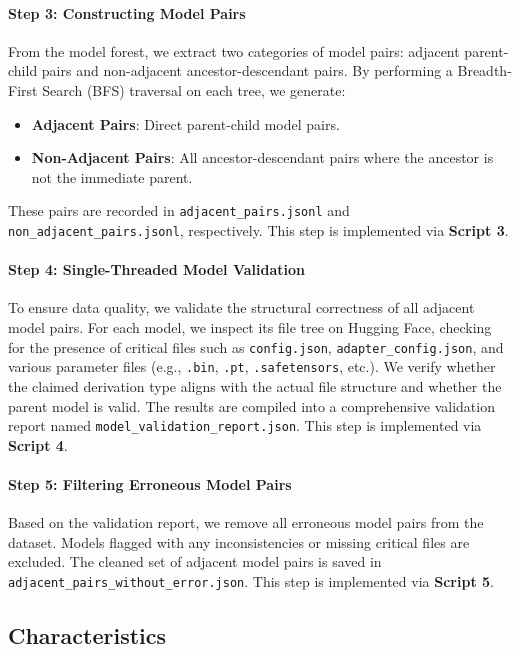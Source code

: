 \paragraph{Step 3: Constructing Model Pairs}
From the model forest, we extract two categories of model pairs: adjacent parent-child pairs and non-adjacent ancestor-descendant pairs. By performing a Breadth-First Search (BFS) traversal on each tree, we generate:
\begin{itemize}
    \item \textbf{Adjacent Pairs}: Direct parent-child model pairs.
    \item \textbf{Non-Adjacent Pairs}: All ancestor-descendant pairs where the ancestor is not the immediate parent.
\end{itemize}
These pairs are recorded in \texttt{adjacent\_pairs.jsonl} and \texttt{non\_adjacent\_pairs.jsonl}, respectively. This step is implemented via \textbf{Script 3}.

\paragraph{Step 4: Single-Threaded Model Validation}
To ensure data quality, we validate the structural correctness of all adjacent model pairs. For each model, we inspect its file tree on Hugging Face, checking for the presence of critical files such as \texttt{config.json}, \texttt{adapter\_config.json}, and various parameter files (e.g., \texttt{.bin}, \texttt{.pt}, \texttt{.safetensors}, etc.). We verify whether the claimed derivation type aligns with the actual file structure and whether the parent model is valid. The results are compiled into a comprehensive validation report named \texttt{model\_validation\_report.json}. This step is implemented via \textbf{Script 4}.

\paragraph{Step 5: Filtering Erroneous Model Pairs}
Based on the validation report, we remove all erroneous model pairs from the dataset. Models flagged with any inconsistencies or missing critical files are excluded. The cleaned set of adjacent model pairs is saved in \texttt{adjacent\_pairs\_without\_error.json}. This step is implemented via \textbf{Script 5}.

\subsection{Characteristics}

